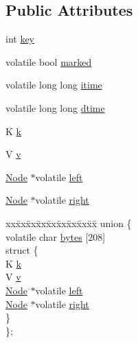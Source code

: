 \subsection*{Public Attributes}
\begin{DoxyCompactItemize}
\item 
int \hyperlink{classNode_a0d5f29b75d1a6c47ef08c2bc993f03c0}{key}
\item 
volatile bool \hyperlink{classNode_ad1ad570bba87cab1d79d419129173e90}{marked}
\item 
volatile long long \hyperlink{classNode_a43227ccd8b7604ac51336fd368451784}{itime}
\item 
volatile long long \hyperlink{classNode_af7ad969e3edbea0602b1a653f9ba0a7c}{dtime}
\item 
K \hyperlink{classNode_a3a7754a22c66b5300a2892b18bc66c3f}{k}
\item 
V \hyperlink{classNode_aae93698bf451fa862b4b1b5466d36dfd}{v}
\item 
\hyperlink{classNode}{Node} $\ast$volatile \hyperlink{classNode_a13ed6bdab297ee3dc66ca598f51fdbb5}{left}
\item 
\hyperlink{classNode}{Node} $\ast$volatile \hyperlink{classNode_a1075c82d0b5b7ca91ce4d37b1d651b30}{right}
\item 
\begin{tabbing}
xx\=xx\=xx\=xx\=xx\=xx\=xx\=xx\=xx\=\kill
union \{\\
\>volatile char \hyperlink{classNode_a4a5b8f90ab1220e757685cecea531793}{bytes} \mbox{[}208\mbox{]}\\
\>struct \{\\
\>\>K \hyperlink{classNode_a3a7754a22c66b5300a2892b18bc66c3f}{k}\\
\>\>V \hyperlink{classNode_aae93698bf451fa862b4b1b5466d36dfd}{v}\\
\>\>\hyperlink{classNode}{Node} $\ast$volatile \hyperlink{classNode_a13ed6bdab297ee3dc66ca598f51fdbb5}{left}\\
\>\>\hyperlink{classNode}{Node} $\ast$volatile \hyperlink{classNode_a1075c82d0b5b7ca91ce4d37b1d651b30}{right}\\
\>\} \\
\}; \\


\end{tabbing}
\end{DoxyCompactItemize}
